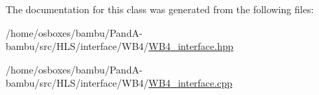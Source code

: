 The documentation for this class was generated from the following files\+:\begin{DoxyCompactItemize}
\item 
/home/osboxes/bambu/\+Pand\+A-\/bambu/src/\+H\+L\+S/interface/\+W\+B4/\hyperlink{WB4__interface_8hpp}{W\+B4\+\_\+interface.\+hpp}\item 
/home/osboxes/bambu/\+Pand\+A-\/bambu/src/\+H\+L\+S/interface/\+W\+B4/\hyperlink{WB4__interface_8cpp}{W\+B4\+\_\+interface.\+cpp}\end{DoxyCompactItemize}
